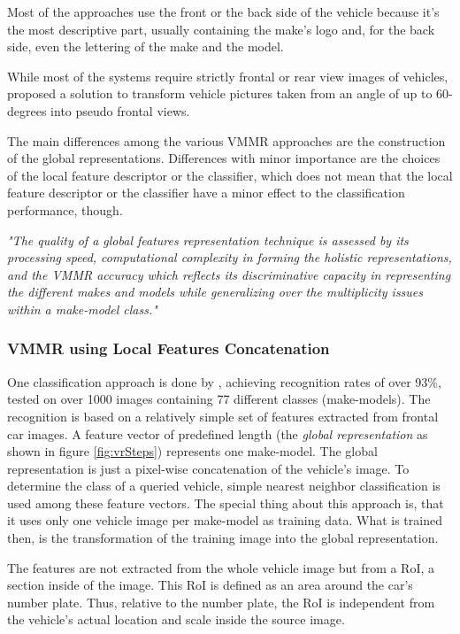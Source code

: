 Most of the approaches use the front or the back side of the vehicle because it's the most descriptive part, usually containing the make's logo and, for the back side, even the lettering of the make and the model.

While most of the systems require strictly frontal or rear view images of vehicles, \citeauthor{shinozuka2013vehicle} proposed a solution to transform vehicle pictures taken from an angle of up to 60-degrees into pseudo frontal views.

The main differences among the various VMMR approaches are the construction of the global representations. Differences with minor importance are the choices of the local feature descriptor or the classifier, which does not mean that the local feature descriptor or the classifier have a minor effect to the classification performance, though.

\emph{"The quality of a global features representation technique is assessed by its processing speed, computational complexity in forming the holistic representations, and the VMMR accuracy which reflects its discriminative capacity in representing the different makes and models while generalizing over the multiplicity issues within a make-model class."} \citep{siddiqui2015robust}

\subsubsection{VMMR using Local Features Concatenation}
One classification approach is done by \citeauthor{petrovic2004analysis} \cite{petrovic2004analysis}, achieving recognition rates of over 93\%, tested on over 1000 images containing 77 different classes (make-models). The recognition is based on a relatively simple set of features extracted from frontal car images. A feature vector of predefined length (the \emph{global representation} as shown in figure \ref{fig:vrSteps}) represents one make-model. The global representation is just a pixel-wise concatenation of the vehicle's image. To determine the class of a queried vehicle, simple nearest neighbor classification is used among these feature vectors. The special thing about this approach is, that it uses only one vehicle image per make-model as training data. What is trained then, is the transformation of the training image into the global representation.

The features are not extracted from the whole vehicle image but from a RoI, a section inside of the image. This RoI is defined as an area around the car's number plate. Thus, relative to the number plate, the RoI is independent from the vehicle's actual location and scale inside the source image.

